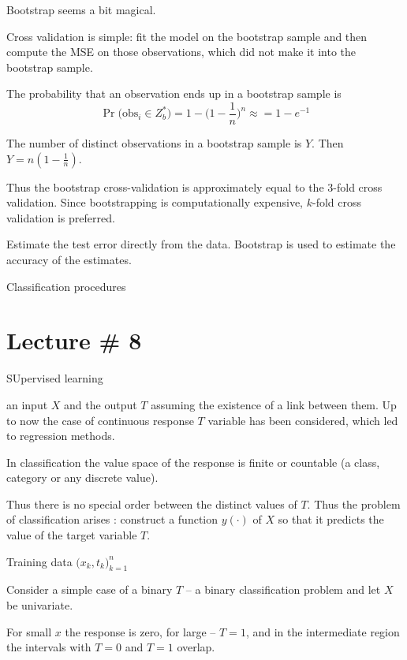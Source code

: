 \documentclass[a4paper]{article}
\begin{document}
Bootstrap seems a bit magical.

Cross validation is simple: fit the model on the bootstrap sample and then compute the MSE on those observations, which did not make it into the bootstrap sample.

The probability that an observation ends up in a bootstrap sample is 
\[\Pr\big(\text{obs}_i\in Z^*_b\big) = 1 - \big(1-\frac{1}{n}\big)^n\approx = 1-e^{-1}\]

The number of distinct observations in a bootstrap sample is $Y$. Then $Y = n (1-\frac{1}{n})$.

Thus the bootstrap cross-validation is approximately equal to the $3$-fold cross validation.
Since bootstrapping is computationally expensive, $k$-fold cross validation is preferred.




Estimate the test error directly from the data.
Bootstrap is used to estimate the accuracy of the estimates.




Classification procedures


\clearpage
\section{Lecture \# 8} %
\label{sec:lecture_8}

SUpervised learning

an input $X$ and the output $T$ assuming the existence of a link between them. Up to now the case of continuous response $T$ variable has been considered, which led to regression methods.

In classification the value space of the response is finite or countable (a class, category or any discrete value).

Thus there is no special order between the distinct values of $T$. 
Thus the problem of classification arises :
construct a function $y(\cdot)$ of $X$ so that it predicts the value of the target variable $T$.

Training data $\big(x_k, t_k\big)_{k=1}^n$ 

Consider a simple case of a binary $T$ -- a binary classification problem and let $X$ be univariate.

For small $x$ the response is zero, for large -- $T=1$, and in the intermediate region the intervals with $T=0$ and $T=1$ overlap.
\end{document}
